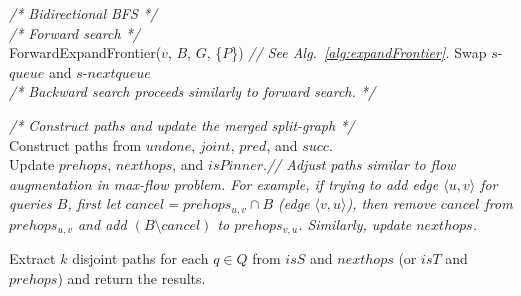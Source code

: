 \begin{algorithm}[H]
{        \textit{\color{blue}/* Bidirectional BFS */} \\
        {
            \textit{\color{gray}/* Forward search */} \\
            {
                ForwardExpandFrontier($v$, $B$, $G$, \{$P$\}) \textit{\color{gray}// See Alg.~\ref{alg:expandFrontier}.}
            }
            Swap $s$-$queue$ and $s$-$nextqueue$ \\
            \textit{\color{gray}/* Backward search proceeds similarly to forward search. */}
        }

        \textit{\color{blue}/* Construct paths and update the merged split-graph */} \\
        Construct paths from $undone$, $joint$, $pred$, and $succ$. \\
        Update $prehops$, $nexthops$, and $isPinner$.\textit{\color{gray}// Adjust paths similar to flow augmentation in max-flow problem. For example, if trying to add edge $\langle u, v\rangle$ for queries $B$, first let $cancel = prehops_{u, v} \cap B$ (edge $\langle v, u\rangle$), then remove $cancel$ from $prehops_{u, v}$ and add $(B \setminus cancel)$ to $prehops_{v, u}$. Similarly, update $nexthops$.} \\
    }
    
    Extract $k$ disjoint paths for each $q \in Q$ from $isS$ and $nexthops$ (or $isT$ and $prehops$) and return the results. \\
\end{algorithm}